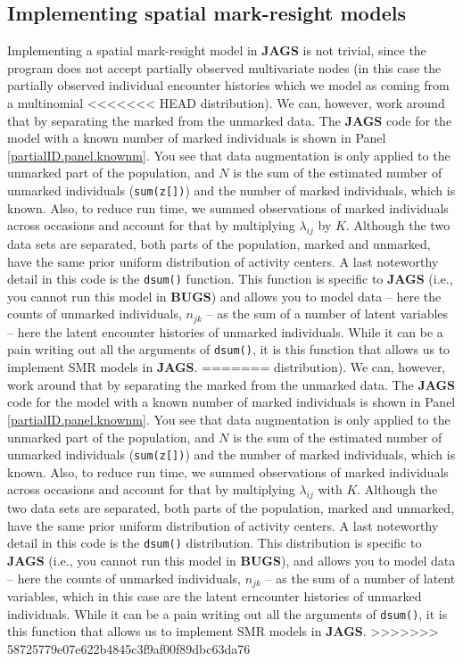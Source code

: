 \subsection{Implementing spatial mark-resight models}
Implementing a spatial mark-resight model in {\bf JAGS} is not
trivial, since the program does not accept partially observed
multivariate nodes (in this case the partially observed individual
encounter histories which we model as coming from a multinomial
<<<<<<< HEAD
distribution). We can, however, work around that by separating the marked from the unmarked data. The {\bf JAGS} code for the model with a known number of marked individuals is shown in Panel \ref{partialID.panel.knownm}. You see that data augmentation is only applied to the unmarked part of the population, and $N$ is the sum of the estimated number of unmarked individuals ({\tt sum(z[])}) and the number of marked individuals, which is known. Also, to reduce run time, we summed observations of marked individuals across occasions and account for that by multiplying $\lambda_{ij}$ by $K$. Although the two data sets are separated, both parts of the population, marked and unmarked, have the same prior uniform distribution of activity centers.
A last noteworthy detail in this code is the {\tt dsum()} function. This function is specific to {\bf JAGS} (i.e., you cannot run this model in {\bf BUGS}) and allows you to model data -- here the counts of unmarked individuals, $n_{jk}$ -- as the sum of a number of latent variables -- here the latent encounter histories of unmarked individuals. While it can be a pain writing out all the arguments of {\tt dsum()}, it is this function that allows us to implement SMR models in {\bf JAGS}.
=======
distribution). We can, however, work around that by separating the marked from the unmarked data. The {\bf JAGS} code for the model with a known number of marked individuals is shown in Panel \ref{partialID.panel.knownm}. You see that data augmentation is only applied to the unmarked part of the population, and $N$ is the sum of the estimated number of unmarked individuals ({\tt sum(z[])}) and the number of marked individuals, which is known. Also, to reduce run time, we summed observations of marked individuals across occasions and account for that by multiplying $\lambda_{ij}$ with $K$. Although the two data sets are separated, both parts of the population, marked and unmarked, have the same prior uniform distribution of activity centers.
A last noteworthy detail in this code is the {\tt dsum()}
distribution. %
This distribution %
is specific to {\bf JAGS} (i.e., you cannot run this model in {\bf
  BUGS}), and allows you to model data -- here the counts of unmarked
individuals, $n_{jk}$ -- as the sum of a number of latent variables,
which in this case are
the latent erncounter histories of unmarked individuals. While it can be a pain writing out all the arguments of {\tt dsum()}, it is this function that allows us to implement SMR models in {\bf JAGS}.
>>>>>>> 58725779e07e622b4845c3f9af00f89dbc63da76

